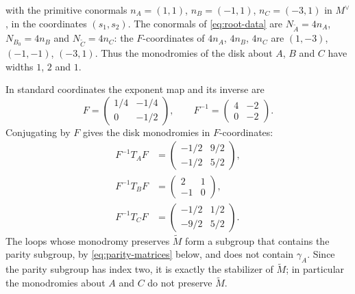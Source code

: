 with the primitive conormals $n_A=(1,1)$, $n_B=(-1,1)$, $n_C=(-3,1)$ in
$M^\vee$, in the coordinates $(s_1,s_2)$.  The conormals of
\eqref{eq:root-data} are
$N_{\widetilde A}=4n_A$, $N_{B_0}=4n_B$ and $N_{\widetilde C}=4n_C$: the
$F$-coordinates of $4n_A$, $4n_B$, $4n_C$ are $(1,-3)$, $(-1,-1)$, $(-3,1)$.
Thus the monodromies of the disk about $A$, $B$ and $C$ have widths $1$, $2$
and $1$.

In standard coordinates the exponent map and its inverse are
\[
 F=\begin{pmatrix}1/4&-1/4\\0&-1/2\end{pmatrix},
 \qquad
 F^{-1}=\begin{pmatrix}4&-2\\0&-2\end{pmatrix}.
\]
Conjugating by $F$ gives the disk monodromies in $F$-coordinates:
\begin{equation}\label{eq:unbranched-conjugates}
\begin{aligned}
 F^{-1}T_AF&=\begin{pmatrix}-1/2&9/2\\-1/2&5/2\end{pmatrix},\\
 F^{-1}T_BF&=\begin{pmatrix}2&1\\-1&0\end{pmatrix},\\
 F^{-1}T_CF&=\begin{pmatrix}-1/2&1/2\\-9/2&5/2\end{pmatrix}.
\end{aligned}
\end{equation}
The loops whose monodromy preserves $\widetilde M$ form a subgroup that
contains the parity subgroup, by \eqref{eq:parity-matrices} below, and does
not contain $\gamma_A$.  Since the parity subgroup has index two, it is
exactly the stabilizer of $\widetilde M$; in particular the monodromies about
$A$ and $C$ do not preserve $\widetilde M$.

